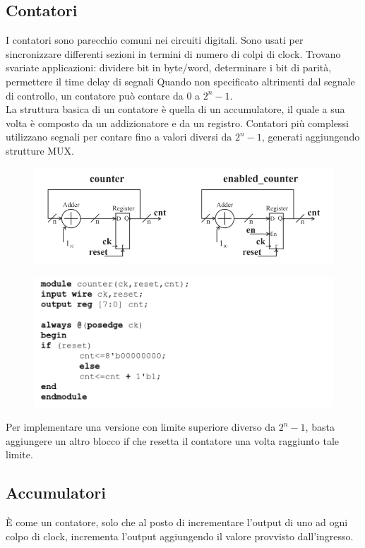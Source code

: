 \documentclass{book}
\begin{document}
    \subsection{Contatori}
            I contatori sono parecchio comuni nei circuiti digitali. Sono usati per 
            sincronizzare differenti sezioni in termini di numero di colpi di clock.
            Trovano svariate applicazioni: dividere bit in byte/word, determinare i bit di parità,
            permettere il time delay di segnali
            Quando non specificato altrimenti dal segnale di controllo, un contatore può contare
            da $0$ a $2^{n}-1$.
            \\ La struttura basica di un contatore è quella di un accumulatore, il quale 
            a sua volta è composto da un addizionatore e da un registro. Contatori più complessi utilizzano
            segnali per contare fino a valori diversi da $2^{n}-1$, generati aggiungendo strutture MUX.
            \begin{figure}[h!]
                \center  
                \includegraphics[width=0.75\linewidth]{img/chapt11img15.png}
            \end{figure}
            \begin{figure}[h!]
                \center  
                \includegraphics[width=0.55\linewidth]{img/chapt11img16.png}
            \end{figure} \newpage
    Per implementare una versione con limite superiore diverso da $2^{n}-1$, basta aggiungere
    un altro blocco if che resetta il contatore una volta raggiunto tale limite.
    \subsection{Accumulatori}
        È come un contatore, solo che al posto di incrementare l'output di uno ad ogni
        colpo di clock, incrementa l'output aggiungendo il valore provvisto dall'ingresso.
\end{document}
